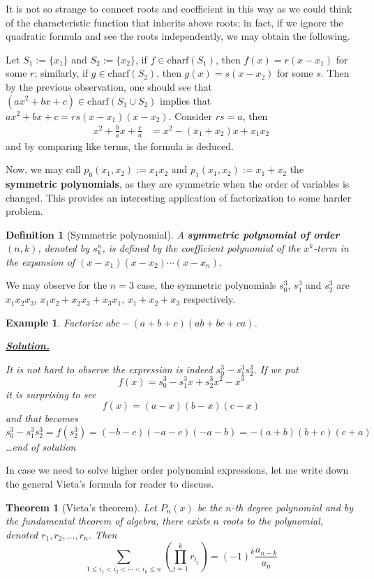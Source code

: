 \documentclass[12pt]{article}
\newtheorem{definition}{Definition}[section]
\newtheorem*{theorem}{Theorem}
\newtheorem*{example}{Example}
\newenvironment{solution}{\begin{snugshade*} \underline{\textbf{Solution.}} \par}{\hfill \textit{\dots end of solution} \end{snugshade*}}
\begin{document}
    It is not so strange to connect roots and coefficient in this way as we could think of the characteristic function that inherits above roots; in fact, if we ignore the quadratic formula and see the roots independently, we may obtain the following.

    Let $S_1:=\{x_1\}$ and $S_2:=\{x_2\}$, if $f\in\mathrm{charf}(S_1)$, then $f(x)=r(x-x_1)$ for some $r$; similarly, if $g\in\mathrm{charf}(S_2)$, then $g(x)=s(x-x_2)$ for some $s$. Then by the previous observation, one should see that $(ax^2+bx+c)\in\mathrm{charf}(S_1\cup S_2)$ implies that $ax^2+bx+c=rs(x-x_1)(x-x_2)$. Consider $rs=a$, then \begin{align*}
        x^2+\frac{b}{a}x+\frac{c}{a}&=x^2-(x_1+x_2)x+x_1x_2
    \end{align*}and by comparing like terms, the formula is deduced.

    Now, we may call $p_0(x_1,x_2):=x_1x_2$ and $p_1(x_1,x_2):=x_1+x_2$ the \textbf{symmetric polynomials}, as they are symmetric when the order of variables is changed. This provides an interesting application of factorization to some harder problem.

    \begin{definition}[Symmetric polynomial]
        A \textbf{symmetric polynomial of order $(n,k)$}, denoted by $s_k^n$, is defined by the coefficient polynomial of the $x^k$-term in the expansion of $(x-x_1)(x-x_2)\cdots(x-x_n)$.
    \end{definition}

    We may observe for the $n=3$ case, the symmetric polynomials $s_0^3$, $s_1^3$ and $s_2^3$ are $x_1x_2x_3$, $x_1x_2+x_2x_3+x_3x_1$, $x_1+x_2+x_3$ respectively.

    \begin{example}
        Factorize $abc-(a+b+c)(ab+bc+ca)$.

        \begin{solution}
            It is not hard to observe the expression is indeed $s_0^3-s_1^3s_2^3$. If we put \[f(x)=s_0^3-s_1^3 x+s_2^3 x^2- x^3\] it is surprising to see \[f(x)=(a-x)(b-x)(c-x)\] and that becomes \[s_0^3-s_1^3s_2^3=f(s_2^3)=(-b-c)(-a-c)(-a-b)=-(a+b)(b+c)(c+a)\]
        \end{solution}
    \end{example}

    In case we need to solve higher order polynomial expressions, let me write down the general Vieta's formula for reader to discuss.

    \begin{theorem}[Vieta's theorem]
        Let $P_n(x)$ be the $n$-th degree polynomial and by the fundamental theorem of algebra, there exists $n$ roots to the polynomial, denoted $r_1,r_2,\dots,r_n$. Then \[\sum_{1\leq i_1< i_2<\cdots<i_k\leq n}(\prod_{j=1}^kr_{i_j})=(-1)^k\frac{a_{n-k}}{a_n}\]
    \end{theorem}
\end{document}
